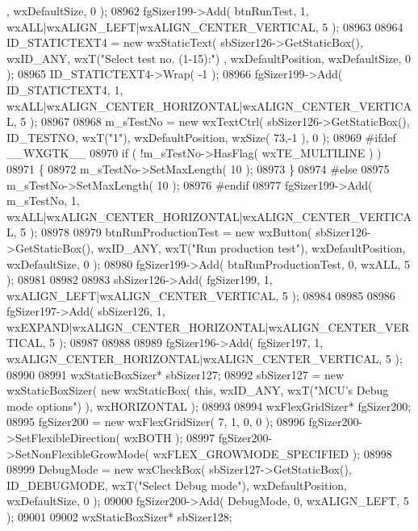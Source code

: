 \begin{DoxyCode}
      , wxDefaultSize, 0 );
08962     fgSizer199->Add( btnRunTest, 1, wxALL|wxALIGN\_LEFT|wxALIGN\_CENTER\_VERTICAL, 5 );
08963     
08964     ID_STATICTEXT4 = \textcolor{keyword}{new} wxStaticText( sbSizer126->GetStaticBox(), wxID\_ANY, wxT(\textcolor{stringliteral}{"Select test no. (1-15):"})
      , wxDefaultPosition, wxDefaultSize, 0 );
08965     ID_STATICTEXT4->Wrap( -1 );
08966     fgSizer199->Add( ID_STATICTEXT4, 1, wxALL|wxALIGN\_CENTER\_HORIZONTAL|wxALIGN\_CENTER\_VERTICAL, 5 );
08967     
08968     m_sTestNo = \textcolor{keyword}{new} wxTextCtrl( sbSizer126->GetStaticBox(), ID_TESTNO, wxT(\textcolor{stringliteral}{"1"}), wxDefaultPosition, wxSize(
       73,-1 ), 0 );
08969 \textcolor{preprocessor}{    #ifdef \_\_WXGTK\_\_}
08970     \textcolor{keywordflow}{if} ( !m_sTestNo->HasFlag( wxTE\_MULTILINE ) )
08971     \{
08972     m_sTestNo->SetMaxLength( 10 );
08973     \}
08974 \textcolor{preprocessor}{    #else}
08975     m_sTestNo->SetMaxLength( 10 );
08976 \textcolor{preprocessor}{    #endif}
08977     fgSizer199->Add( m_sTestNo, 1, wxALL|wxALIGN\_CENTER\_HORIZONTAL|wxALIGN\_CENTER\_VERTICAL, 5 );
08978     
08979     btnRunProductionTest = \textcolor{keyword}{new} wxButton( sbSizer126->GetStaticBox(), wxID\_ANY, wxT(\textcolor{stringliteral}{"Run production test"}), 
      wxDefaultPosition, wxDefaultSize, 0 );
08980     fgSizer199->Add( btnRunProductionTest, 0, wxALL, 5 );
08981     
08982     
08983     sbSizer126->Add( fgSizer199, 1, wxALIGN\_LEFT|wxALIGN\_CENTER\_VERTICAL, 5 );
08984     
08985     
08986     fgSizer197->Add( sbSizer126, 1, wxEXPAND|wxALIGN\_CENTER\_HORIZONTAL|wxALIGN\_CENTER\_VERTICAL, 5 );
08987     
08988     
08989     fgSizer196->Add( fgSizer197, 1, wxALIGN\_CENTER\_HORIZONTAL|wxALIGN\_CENTER\_VERTICAL, 5 );
08990     
08991     wxStaticBoxSizer* sbSizer127;
08992     sbSizer127 = \textcolor{keyword}{new} wxStaticBoxSizer( \textcolor{keyword}{new} wxStaticBox( \textcolor{keyword}{this}, wxID\_ANY, wxT(\textcolor{stringliteral}{"MCU's Debug mode options"}) ), 
      wxHORIZONTAL );
08993     
08994     wxFlexGridSizer* fgSizer200;
08995     fgSizer200 = \textcolor{keyword}{new} wxFlexGridSizer( 7, 1, 0, 0 );
08996     fgSizer200->SetFlexibleDirection( wxBOTH );
08997     fgSizer200->SetNonFlexibleGrowMode( wxFLEX\_GROWMODE\_SPECIFIED );
08998     
08999     DebugMode = \textcolor{keyword}{new} wxCheckBox( sbSizer127->GetStaticBox(), ID_DEBUGMODE, wxT(\textcolor{stringliteral}{"Select Debug mode"}), 
      wxDefaultPosition, wxDefaultSize, 0 );
09000     fgSizer200->Add( DebugMode, 0, wxALIGN\_LEFT, 5 );
09001     
09002     wxStaticBoxSizer* sbSizer128;

\end{DoxyCode}
